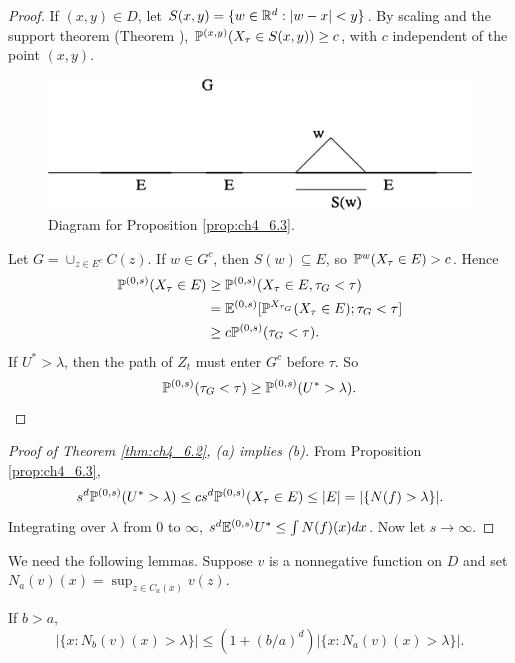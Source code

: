 \begin{proof}
If $(x,y) \in D$, let $S(x,y) = \{w \in \R^d : |w-x| < y\}$. By scaling and the support theorem (Theorem ), $\P^{(x,y)}(X_\tau \in S(x,y)) \geq c$, with $c$ independent of the point $(x,y)$.

\bigskip
\begin{figure}[ht]
    \centering\includegraphics{Images/Img9.png}
    \bigskip
    \caption{Diagram for Proposition \ref{prop:ch4_6.3}.}
    \label{fig:ch4_6.1}
\end{figure}

Let $G = \cup_{z\in E^c}C(z)$. If $w \in G^c$, then $S(w) \subseteq E$, so $\P^w(X_\tau \in E) > c$. Hence
\begin{align*}
    \P^{(0,s)}(X_\tau \in E) &\geq \P^{(0,s)}(X_\tau \in E, \tau_G < \tau) \\
    &= \E^{(0,s)}[\P^{X_{\tau_G}}(X_\tau \in E); \tau_G < \tau] \\
    &\geq c\P^{(0,s)}(\tau_G < \tau).
\end{align*}
If $U^* > \lambda$, then the path of $Z_t$ must enter $G^c$ before $\tau$. So
\[
    \P^{(0,s)}(\tau_G < \tau) \geq \P^{(0,s)}(U^* > \lambda).
\]
\end{proof}

\begin{proof}[Proof of Theorem \ref{thm:ch4_6.2}, (a) implies (b)]
From Proposition \ref{prop:ch4_6.3},
\[
    s^d\P^{(0,s)}(U^* > \lambda) \leq cs^d\P^{(0,s)}(X_\tau \in E) \leq |E| = |\{N(f) > \lambda\}|.
\]
Integrating over $\lambda$ from $0$ to $\infty$, $s^d\E^{(0,s)}U^* \leq \int N(f)(x)dx$. Now let $s \to \infty$.
\end{proof}

We need the following lemmas. Suppose $v$ is a nonnegative function on $D$ and set $N_a(v)(x) = \sup_{z\in C_a(x)} v(z)$.

\begin{lemma}\label{lem:ch4_6.4}
If $b > a$,
\[
    |\{x : N_b(v)(x) > \lambda\}| \leq (1+(b/a)^d)|\{x : N_a(v)(x) > \lambda\}|.
\]
\end{lemma}

